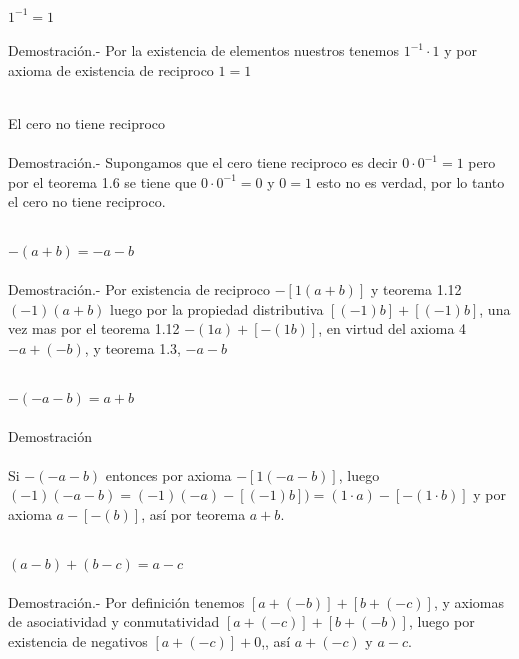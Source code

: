\begin{teo}
$1^{-1}=1$\\\\
Demostración.- \;
Por la existencia de elementos nuestros tenemos $1^{-1}\cdot 1$ y por axioma de existencia de reciproco $1=1$\\\\
\end{teo}

\begin{teo}
El cero no tiene reciproco\\\\
Demostración.- \;
Supongamos que el cero tiene reciproco es decir $0\cdot 0^{-1}=1$ pero por el teorema 1.6 se tiene que $0\cdot 0^{-1}=0$ y $0=1$ esto no es verdad, por lo tanto el cero no tiene reciproco.\\\\
\end{teo}

\begin{teo}
$-(a+b)=-a-b$\\\\
Demostración.- \;
Por existencia de reciproco $-\left[1(a+b)\right]$ y teorema 1.12 $(-1)(a+b)$ luego por la propiedad distributiva $\left[ (-1)b \right] + \left[ (-1)b \right]$, una vez mas por el teorema 1.12 $-(1a)+ \left[-(1b)\right]$, en virtud del axioma 4 $-a+(-b)$, y teorema 1.3, $-a-b$ \\\\ 
\end{teo}

\begin{teo}
$-(-a-b)=a+b$\\\\
Demostración\\\\
Si $-(-a-b)$ entonces por axioma $-\left[1(-a-b)\right]$, luego $(-1)(-a-b)=(-1)(-a)-\left[(-1)b\right])= (1\cdot a)-\left[-(1\cdot b)\right]$ y por axioma $a - \left[ - (b)\right]$, así por teorema $a+b$.\\\\
\end{teo}

\begin{teo}
$(a-b)+(b-c)=a-c$\\\\
Demostración.- \;
Por definición tenemos $\left[ a+(-b) \right]+\left[ b+(-c) \right]$, y axiomas de asociatividad y conmutatividad $\left[ a+(-c) \right]+\left[ b+(-b) \right]$, luego por existencia de negativos  $\left[ a+(-c) \right] + 0$,, así $a+(-c)$ y $a-c$. \\\\
\end{teo}

